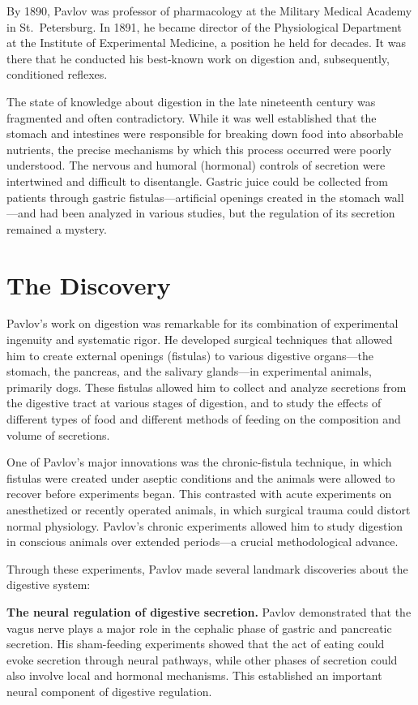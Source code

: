 By 1890, Pavlov was professor of pharmacology at the Military Medical Academy in St.\ Petersburg. In 1891, he became director of the Physiological Department at the Institute of Experimental Medicine, a position he held for decades. It was there that he conducted his best-known work on digestion and, subsequently, conditioned reflexes.\cite{pavlov-history}

The state of knowledge about digestion in the late nineteenth century was fragmented and often contradictory. While it was well established that the stomach and intestines were responsible for breaking down food into absorbable nutrients, the precise mechanisms by which this process occurred were poorly understood. The nervous and humoral (hormonal) controls of secretion were intertwined and difficult to disentangle. Gastric juice could be collected from patients through gastric fistulas---artificial openings created in the stomach wall---and had been analyzed in various studies, but the regulation of its secretion remained a mystery.

\section{The Discovery}

Pavlov's work on digestion was remarkable for its combination of experimental ingenuity and systematic rigor. He developed surgical techniques that allowed him to create external openings (fistulas) to various digestive organs---the stomach, the pancreas, and the salivary glands---in experimental animals, primarily dogs. These fistulas allowed him to collect and analyze secretions from the digestive tract at various stages of digestion, and to study the effects of different types of food and different methods of feeding on the composition and volume of secretions.

One of Pavlov's major innovations was the chronic-fistula technique, in which fistulas were created under aseptic conditions and the animals were allowed to recover before experiments began. This contrasted with acute experiments on anesthetized or recently operated animals, in which surgical trauma could distort normal physiology. Pavlov's chronic experiments allowed him to study digestion in conscious animals over extended periods---a crucial methodological advance.\cite{pavlov-history}

Through these experiments, Pavlov made several landmark discoveries about the digestive system:

\textbf{The neural regulation of digestive secretion.} Pavlov demonstrated that the vagus nerve plays a major role in the cephalic phase of gastric and pancreatic secretion. His sham-feeding experiments showed that the act of eating could evoke secretion through neural pathways, while other phases of secretion could also involve local and hormonal mechanisms. This established an important neural component of digestive regulation.\cite{pavlov-physiology}

